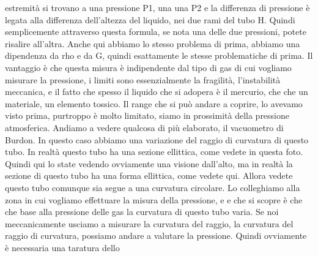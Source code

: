 estremità si trovano a una pressione P1, una una P2 e la differenza di pressione è legata alla differenza dell'altezza del liquido, nei due rami del tubo H. Quindi semplicemente attraverso questa formula, se nota una delle due pressioni, potete risalire all'altra. Anche qui abbiamo lo stesso problema di prima, abbiamo una dipendenza da rho e da G, quindi esattamente le stesse problematiche di prima. Il vantaggio è che questa misura è indipendente dal tipo di gas di cui vogliamo misurare la pressione, i limiti sono essenzialmente la fragilità, l'instabilità meccanica, e il fatto che spesso il liquido che si adopera è il mercurio, che che un materiale, un elemento tossico. Il range che si può andare a coprire, lo avevamo visto prima, purtroppo è molto limitato, siamo in prossimità della pressione atmosferica. Andiamo a vedere qualcosa di più elaborato, il vacuometro di Burdon. In questo caso abbiamo una variazione del raggio di curvatura di questo tubo. In realtà questo tubo ha una sezione ellittica, come vedete in questa foto. Quindi qui lo state vedendo ovviamente una visione dall'alto, ma in realtà la sezione di questo tubo ha una forma ellittica, come vedete qui. Allora vedete questo tubo comunque sia segue a una curvatura circolare. Lo colleghiamo alla zona in cui vogliamo effettuare la misura della pressione, e e che si scopre è che che base alla pressione delle gas la curvatura di questo tubo varia. Se noi meccanicamente usciamo a misurare la curvatura del raggio, la curvatura del raggio di curvatura, possiamo andare a valutare la pressione. Quindi ovviamente è necessaria una taratura dello 

